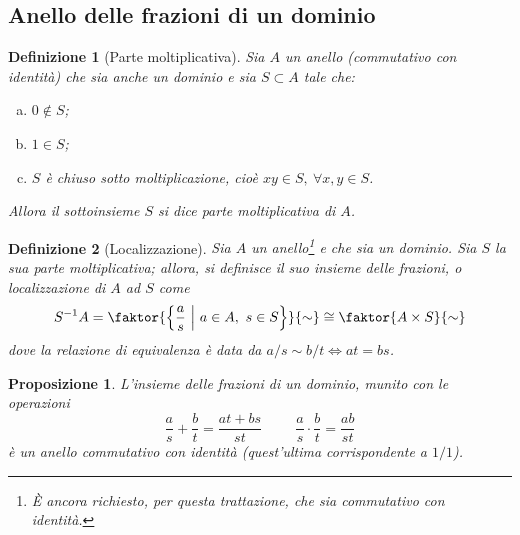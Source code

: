 \documentclass[12pt]{scrartcl}
\theoremstyle{style}
\newtheorem{definizione}{Definizione}[section]
\newtheorem{prop}{Proposizione}[section]
\numberwithin{equation}{subsection}
\begin{document}
\subsection{Anello delle frazioni di un dominio}
\begin{definizione}
	[Parte moltiplicativa]
	Sia $A$ un anello (commutativo con identit\`a) che sia anche un dominio e sia $S \subset A$ tale che:
	\begin{enumerate}[(a).]
		\item $0 \not \in S$;
		\item $1 \in S$;
		\item $S$ \`e chiuso sotto moltiplicazione, cio\`e $xy \in S, \ \forall x,y \in S$.
	\end{enumerate}
	Allora il sottoinsieme $S$ si dice \textit{parte moltiplicativa} di $A$.
\end{definizione}
\begin{definizione}
	[Localizzazione]
	Sia $A$ un anello\footnote{\`E ancora richiesto, per questa trattazione, che sia commutativo con identit\`a.} e che sia un dominio.
	Sia $S$ la sua parte moltiplicativa; allora, si definisce il suo \textit{insieme delle frazioni}, o \textit{localizzazione di $A$ ad $S$} come
	\[
		S^{-1}A = \faktor{\left\{ \frac{a}{s}\ \Big\lvert \  a \in A ,\ s \in S \right\}}{\sim} \cong \faktor{A\times S}{\sim}
	\] 
	dove la relazione di equivalenza \`e data da $a / s \sim b / t \iff at = bs$.
\end{definizione}
\begin{prop}
	L'insieme delle frazioni di un dominio, munito con le operazioni
	\[
	\frac{a}{s}+\frac{b}{t}=\frac{at + bs}{st} \hspace{1cm} \frac{a}{s}\cdot \frac{b}{t} = \frac{ab}{st}
	\] 
	\`e un anello commutativo con identit\`a (quest'ultima corrispondente a $1 / 1$).
\end{prop}
\end{document}
